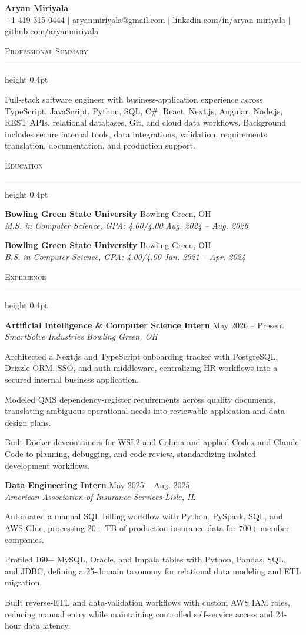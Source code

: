 \documentclass[letterpaper,11pt]{article}
\newcommand{\resumesection}[1]{%
  \par\vspace{2pt}%
  {\large\scshape #1}\par\vspace{2pt}%
  \hrule height 0.4pt\vspace{2pt}%
}
\newcommand{\resumeSubheading}[4]{
  \textbf{#1} \hfill #2\\
  \textit{#3} \hfill \textit{#4}
}
\begin{document}
\begin{center}
  {\LARGE \textbf{Aryan Miriyala}}\\[-1pt]
  \small
  +1 419-315-0444 $|$
  \href{mailto:aryanmiriyala@gmail.com}{aryanmiriyala@gmail.com} $|$
  \href{https://www.linkedin.com/in/aryan-miriyala-7788a21b6/}{linkedin.com/in/aryan-miriyala} $|$
  \href{https://github.com/aryanmiriyala}{github.com/aryanmiriyala}
\end{center}\vspace{-10pt}

\resumesection{Professional Summary}
Full-stack software engineer with business-application experience across TypeScript, JavaScript, Python, SQL, C\#, React, Next.js, Angular, Node.js, REST APIs, relational databases, Git, and cloud data workflows. Background includes secure internal tools, data integrations, validation, requirements translation, documentation, and production support.

\resumesection{Education}
\resumeSubheading
{Bowling Green State University}{Bowling Green, OH}
{M.S. in Computer Science, GPA: 4.00/4.00}{Aug. 2024 -- Aug. 2026}

\resumeSubheading
{Bowling Green State University}{Bowling Green, OH}
{B.S. in Computer Science, GPA: 4.00/4.00}{Jan. 2021 -- Apr. 2024}

\resumesection{Experience}
\resumeSubheading
{Artificial Intelligence \& Computer Science Intern}{May 2026 -- Present}
{SmartSolve Industries}{Bowling Green, OH}
\begin{tightitemize}
  \item Architected a Next.js and TypeScript onboarding tracker with PostgreSQL, Drizzle ORM, SSO, and auth middleware, centralizing HR workflows into a secured internal business application.
  \item Modeled QMS dependency-register requirements across quality documents, translating ambiguous operational needs into reviewable application and data-design plans.
  \item Built Docker devcontainers for WSL2 and Colima and applied Codex and Claude Code to planning, debugging, and code review, standardizing isolated development workflows.
\end{tightitemize}

\resumeSubheading
{Data Engineering Intern}{May 2025 -- Aug. 2025}
{American Association of Insurance Services}{Lisle, IL}
\begin{tightitemize}
  \item Automated a manual SQL billing workflow with Python, PySpark, SQL, and AWS Glue, processing 20+ TB of production insurance data for 700+ member companies.
  \item Profiled 160+ MySQL, Oracle, and Impala tables with Python, Pandas, SQL, and JDBC, defining a 25-domain taxonomy for relational data modeling and ETL migration.
  \item Built reverse-ETL and data-validation workflows with custom AWS IAM roles, reducing manual entry while maintaining controlled self-service access and 24-hour data latency.
\end{tightitemize}
\end{document}
